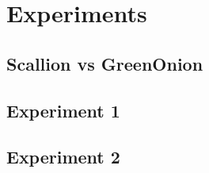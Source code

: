 \chapter{Experiments}
\label{cha:Experiments}

\section{Scallion vs GreenOnion}

\section{Experiment 1}

\section{Experiment 2}
